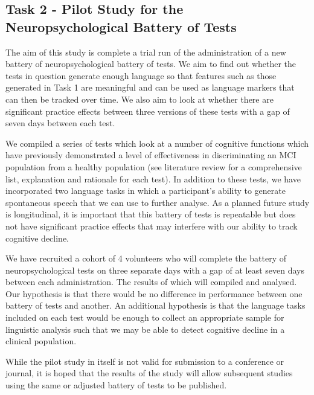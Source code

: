 \documentclass[10pt, letterpaper, twoside, openany]{book}
\begin{document}
\subsection{Task 2 - Pilot Study for the Neuropsychological Battery of Tests}
The aim of this study is complete a trial run of the administration of a new battery of neuropsychological battery of tests. We aim to find out whether the tests in question generate enough language so that features such as those generated in Task 1 are meaningful and can be used as language markers that can then be tracked over time. We also aim to look at whether there are significant practice effects between three versions of these tests with a gap of seven days between each test.
\par 
We compiled a series of tests which look at a number of cognitive functions which have previously demonstrated a level of effectiveness in discriminating an MCI population from a healthy population (see literature review for a comprehensive list, explanation and rationale for each test). In addition to these tests, we have incorporated two language tasks in which a participant's ability to generate spontaneous speech that we can use to further analyse. As a planned future study is longitudinal, it is important that this battery of tests is repeatable but does not have significant practice effects that may interfere with our ability to track cognitive decline.
\par 
We have recruited a cohort of 4 volunteers who will complete the battery of neuropsychological tests on three separate days with a gap of at least seven days between each administration. The results of which will compiled and analysed. Our hypothesis is that there would be no difference in performance between one battery of tests and another. An additional hypothesis is that the language tasks included on each test would be enough to collect an appropriate sample for linguistic analysis such that we may be able to detect cognitive decline in a clinical population.
\par 
While the pilot study in itself is not valid for submission to a conference or journal, it is hoped that the results of the study will allow subsequent studies using the same or adjusted battery of tests to be published.
\end{document}
